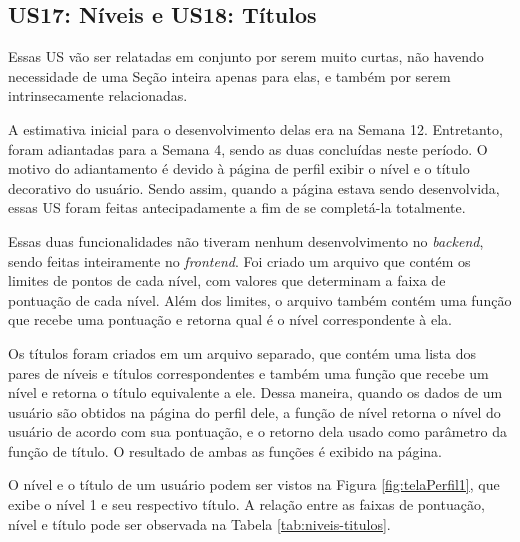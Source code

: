 \subsection[US17: Níveis e US18: Títulos]{US17: Níveis e US18: Títulos}

Essas US vão ser relatadas em conjunto por serem muito curtas, não havendo necessidade de uma Seção inteira apenas para elas, e também por serem intrinsecamente relacionadas.

A estimativa inicial para o desenvolvimento delas era na Semana 12. Entretanto, foram adiantadas para a Semana 4, sendo as duas concluídas neste período. O motivo do adiantamento é devido à página de perfil exibir o nível e o título decorativo do usuário. Sendo assim, quando a página estava sendo desenvolvida, essas US foram feitas antecipadamente a fim de se completá-la totalmente.

Essas duas funcionalidades não tiveram nenhum desenvolvimento no \textit{backend}, sendo feitas inteiramente no \textit{frontend}. Foi criado um arquivo que contém os limites de pontos de cada nível, com valores que determinam a faixa de pontuação de cada nível. Além dos limites, o arquivo também contém uma função que recebe uma pontuação e retorna qual é o nível correspondente à ela.

Os títulos foram criados em um arquivo separado, que contém uma lista dos pares de níveis e títulos correspondentes e também uma função que recebe um nível e retorna o título equivalente a ele. Dessa maneira, quando os dados de um usuário são obtidos na página do perfil dele, a função de nível retorna o nível do usuário de acordo com sua pontuação, e o retorno dela usado como parâmetro da função de título. O resultado de ambas as funções é exibido na página. 

O nível e o título de um usuário podem ser vistos na Figura \ref{fig:telaPerfil1}, que exibe o nível 1 e seu respectivo título. A relação entre as faixas de pontuação, nível e título pode ser observada na Tabela \ref{tab:niveis-titulos}.

\newpage

